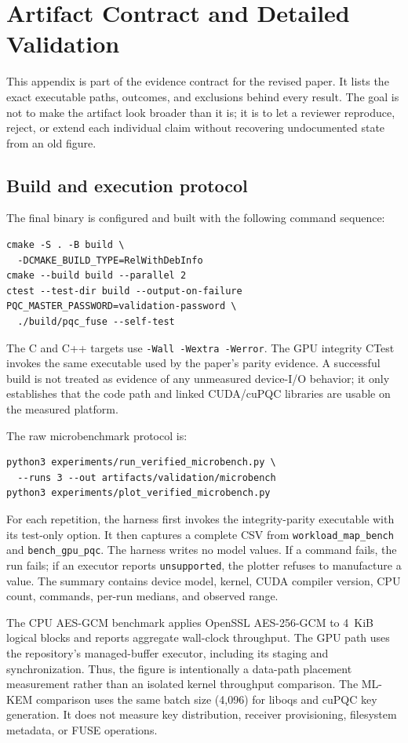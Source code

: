 \section{Artifact Contract and Detailed Validation}
\label{sec:appendix}

This appendix is part of the evidence contract for the revised paper.  It lists the exact executable paths, outcomes, and exclusions behind every result.  The goal is not to make the artifact look broader than it is; it is to let a reviewer reproduce, reject, or extend each individual claim without recovering undocumented state from an old figure.

\subsection{Build and execution protocol}
\label{sec:app_theory}

The final binary is configured and built with the following command sequence:
\begin{verbatim}
cmake -S . -B build \
  -DCMAKE_BUILD_TYPE=RelWithDebInfo
cmake --build build --parallel 2
ctest --test-dir build --output-on-failure
PQC_MASTER_PASSWORD=validation-password \
  ./build/pqc_fuse --self-test
\end{verbatim}
The C and C++ targets use \texttt{-Wall -Wextra -Werror}.  The GPU integrity CTest invokes the same executable used by the paper's parity evidence.  A successful build is not treated as evidence of any unmeasured device-I/O behavior; it only establishes that the code path and linked CUDA/cuPQC libraries are usable on the measured platform.

The raw microbenchmark protocol is:
\begin{verbatim}
python3 experiments/run_verified_microbench.py \
  --runs 3 --out artifacts/validation/microbench
python3 experiments/plot_verified_microbench.py
\end{verbatim}
For each repetition, the harness first invokes the integrity-parity executable with its test-only option.  It then captures a complete CSV from \texttt{workload\_map\_bench} and \texttt{bench\_gpu\_pqc}.  The harness writes no model values.  If a command fails, the run fails; if an executor reports \texttt{unsupported}, the plotter refuses to manufacture a value.  The summary contains device model, kernel, CUDA compiler version, CPU count, commands, per-run medians, and observed range.

The CPU AES-GCM benchmark applies OpenSSL AES-256-GCM to 4~KiB logical blocks and reports aggregate wall-clock throughput.  The GPU path uses the repository's managed-buffer executor, including its staging and synchronization.  Thus, the figure is intentionally a data-path placement measurement rather than an isolated kernel throughput comparison.  The ML-KEM comparison uses the same batch size (4,096) for liboqs and cuPQC key generation.  It does not measure key distribution, receiver provisioning, filesystem metadata, or FUSE operations.

